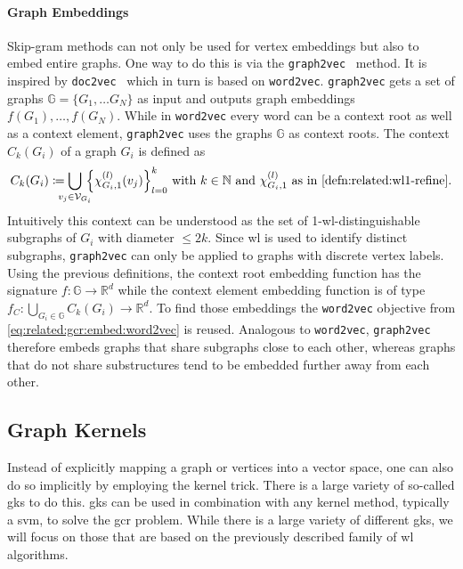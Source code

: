 \paragraph{Graph Embeddings}
Skip-gram methods can not only be used for vertex embeddings but also to embed entire graphs.
One way to do this is via the \texttt{graph2vec}~\cite{Narayanan2017} method.
It is inspired by \texttt{doc2vec}~\cite{Le2014} which in turn is based on \texttt{word2vec}.
\texttt{graph2vec} gets a set of graphs $\mathbb{G} = \{ G_1, \dots G_N \}$ as input and outputs graph embeddings $f(G_1), \dots, f(G_N)$.
While in \texttt{word2vec} every word can be a context root as well as a context element, \texttt{graph2vec} uses the graphs $\mathbb{G}$ as context roots.
The context $C_k(G_i)$ of a graph $G_i$ is defined as
\begin{equation}
	C_k(G_i) \coloneqq \bigcup_{\mathclap{v_j \in \mathcal{V}_{G_i}}}\, {\left\{ \chi_{G_i, 1}^{(l)}(v_j) \right\}}_{l = 0}^k %
	\text{ with $k \in \mathbb{N}$ and $\chi_{G_i, 1}^{(l)}$ as in \cref{defn:related:wl1-refine}.}
\end{equation}
Intuitively this context can be understood as the set of 1-\acs{wl}-distinguishable subgraphs of $G_i$ with diameter $\leq 2k$.
Since \ac{wl} is used to identify distinct subgraphs, \texttt{graph2vec} can only be applied to graphs with discrete vertex labels.
Using the previous definitions, the context root embedding function has the signature $f: \mathbb{G} \to \mathbb{R}^d$ while the context element embedding function is of type $f_C: \bigcup_{G_i \in \mathbb{G}} C_k(G_i) \to \mathbb{R}^d$.
To find those embeddings the \texttt{word2vec} objective from \cref{eq:related:gcr:embed:word2vec} is reused.
Analogous to \texttt{word2vec}, \texttt{graph2vec} therefore embeds graphs that share subgraphs close to each other, whereas graphs that do not share substructures tend to be embedded further away from each other.

\subsection{Graph Kernels}%
\label{sec:related:gcr:kernel}

Instead of explicitly mapping a graph or vertices into a vector space, one can also do so implicitly by employing the kernel trick.
There is a large variety of so-called \acp{gk} to do this.
\acp{gk} can be used in combination with any kernel method, typically a \ac{svm}, to solve the \ac{gcr} problem.
While there is a large variety of different \acp{gk}, we will focus on those that are based on the previously described family of \ac{wl} algorithms.


